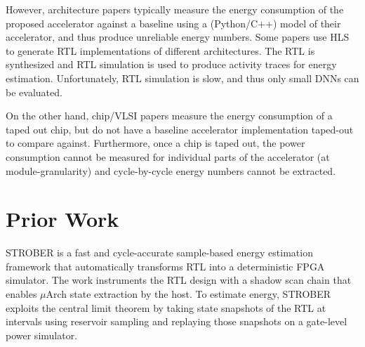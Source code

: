 \documentclass[sigconf]{acmart}
\begin{document}
However, architecture papers typically measure the energy consumption of the proposed accelerator against a baseline using a (Python/C++) model of their accelerator, and thus produce unreliable energy numbers.
Some papers use HLS to generate RTL implementations of different architectures.
The RTL is synthesized and RTL simulation is used to produce activity traces for energy estimation.
Unfortunately, RTL simulation is slow, and thus only small DNNs can be evaluated.

On the other hand, chip/VLSI papers measure the energy consumption of a taped out chip, but do not have a baseline accelerator implementation taped-out to compare against.
Furthermore, once a chip is taped out, the power consumption cannot be measured for individual parts of the accelerator (at module-granularity) and cycle-by-cycle energy numbers cannot be extracted.

\section{Prior Work}
STROBER\cite{strober} is a fast and cycle-accurate sample-based energy estimation framework that automatically transforms RTL into a deterministic FPGA simulator.
The work instruments the RTL design with a shadow scan chain that enables $\mu$Arch state extraction by the host.
To estimate energy, STROBER exploits the central limit theorem by taking state snapshots of the RTL at intervals using reservoir sampling and replaying those snapshots on a gate-level power simulator.



\end{document}
